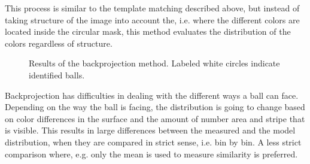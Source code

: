This process is similar to the template matching described above, but instead of taking structure of the image into account the, i.e. where the different colors are located inside the circular mask, this method evaluates the distribution of the colors regardless of structure.
\begin{figure}[H]
  \centering
  \quad           
   \caption{Results of the backprojection method. Labeled white circles indicate identified balls.}
  \label{fig:backprojectResults}
\end{figure}
Backprojection has difficulties in dealing with the different ways a ball can face. Depending on the way the ball is facing, the distribution is going to change based on color differences in the surface and the amount of number area and stripe that is visible. This results in large differences between the measured and the model distribution, when they are compared in strict sense, i.e. bin by bin.  A less strict comparison where, e.g. only the mean is used to measure similarity is preferred.

